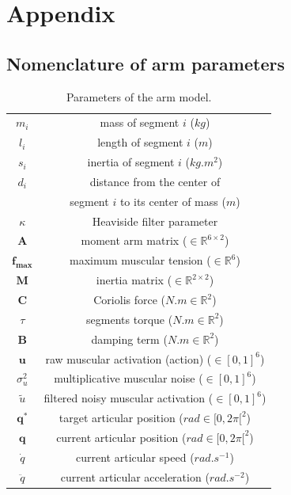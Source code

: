 \documentclass[pdftex,a4paper,11pt]{report}
\begin{document}
\chapter{Appendix}
\section{Nomenclature of arm parameters}
\label{sec:params}

\begin{table}[hbt]
\caption{Parameters of the arm model.}
\begin{center}
\begin{tabular}{|c|c|}
\hline  
$m_i$ & mass of segment $i$ ($kg$) \\
$l_i$ & length of segment $i$ ($m$) \\
$s_i$ & inertia of segment $i$ ($kg.m^2$) \\
$d_i$ & distance from the center of \\
      &  segment $i$ to its center of mass ($m$) \\
$\kappa$ & Heaviside filter parameter \\
$\textbf{A}$ & moment arm matrix ($\in \mathbb{R}^{6 \times 2}$)\\
$\textbf{f}_{\textbf{max}}$ & maximum muscular tension ($\in \mathbb{R}^6$)\\
$\textbf{M}$ & inertia matrix ($\in \mathbb{R}^{2 \times 2}$)\\
$\textbf{C}$ & Coriolis force ($N.m \in \mathbb{R}^2$)\\
$\tau$ & segments torque ($N.m \in \mathbb{R}^2$)\\

$\textbf{B}$ & damping term ($N.m \in \mathbb{R}^2$)\\
$\textbf{u}$ & raw muscular activation (action) ($\in [0,1]^6$)\\
$\sigma_u^2$ & multiplicative muscular noise ($\in [0,1]^6$)\\
$\tilde{u}$ & filtered noisy muscular activation ($\in [0,1]^6$)\\
$\textbf{q}^*$ & target articular position ($rad \in [0,2\pi[^2$)\\
$\textbf{q}$ & current articular position ($rad \in [0,2\pi[^2$)\\
$\dot{q}$ & current articular speed ($rad.s^{-1}$)\\
$\ddot{q}$ & current articular acceleration ($rad.s^{-2}$)\\
\hline
\end{tabular}
\end{center}
\label{arm_model_params}
\end{table}
\end{document}
